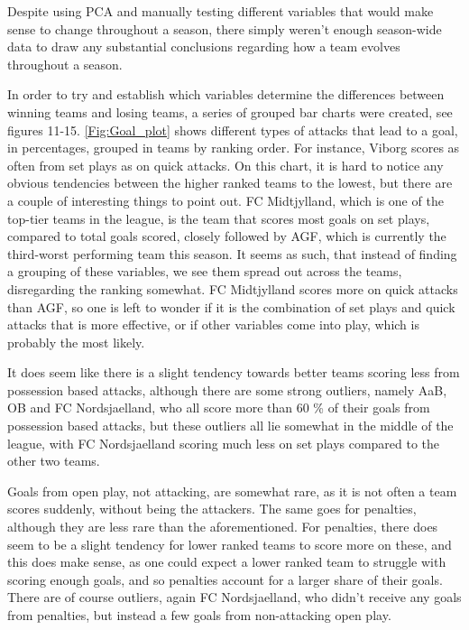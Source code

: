 \documentclass[Report.tex]{subfiles}
\begin{document}
Despite using PCA and manually testing different variables that would make sense to change throughout a season, there simply weren't enough season-wide data to draw any substantial conclusions regarding how a team evolves throughout a season.

In order to try and establish which variables determine the differences between
winning teams and losing teams, a series of grouped bar charts were created, see
figures 11-15. \ref{Fig:Goal_plot} shows different types of attacks that lead to a goal,
in percentages, grouped in teams by ranking order. For instance, Viborg scores
as often from set plays as on quick attacks.
On this chart, it is hard to notice any obvious tendencies between the higher
ranked teams to the lowest, but there are a couple of interesting things to
point out. FC Midtjylland, which is one of the top-tier teams in the league, is
the team that scores most goals on set plays, compared to total goals scored,
closely followed by AGF, which is currently the third-worst performing team
this season. It seems as such, that instead of finding a grouping of these
variables, we see them spread out across the teams, disregarding the ranking
somewhat. FC Midtjylland scores more on quick attacks than AGF, so one is left
to wonder if it is the combination of set plays and quick attacks that is more
effective, or if other variables come into play, which is probably the most
likely. 

It does seem like there is a slight tendency towards better teams scoring less
from possession based attacks, although there are some strong outliers, namely
AaB, OB and FC Nordsjaelland, who all score more than 60 \% of their
goals from possession based attacks, but these outliers all lie somewhat in the
middle of the league, with FC Nordsjaelland scoring much less on set plays
compared to the other two teams. 

Goals from open play, not attacking, are somewhat rare, as it is not often a
team scores suddenly, without being the attackers. The same goes for penalties,
although they are less rare than the aforementioned. For penalties, there does
seem to be a slight tendency for lower ranked teams to score more on these, and
this does make sense, as one could expect a lower ranked team to struggle with
scoring enough goals, and so penalties account for a larger share of their
goals. There are of course outliers, again FC Nordsjaelland, who didn't receive
any goals from penalties, but instead a few goals from non-attacking open play. 
\end{document}
